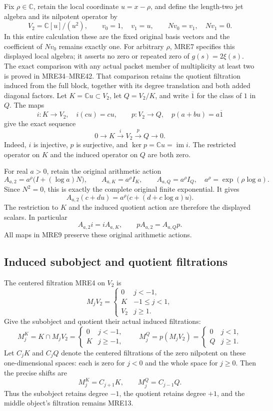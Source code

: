 Fix \(\rho\in\mathbb C\), retain the local coordinate \(u=x-\rho\), and
define the length-two jet algebra and its nilpotent operator by
\[
 V_2=\mathbb C[u]/(u^2),\qquad
 v_0=1,\quad v_1=u,\qquad
 Nv_0=v_1,\quad Nv_1=0.
 \tag{MRE7}
\]
In this entire calculation these are the fixed original basis vectors
and the coefficient of \(Nv_0\) remains exactly one.
For arbitrary \(\rho\), MRE7 specifies this displayed local algebra;
it asserts no zero or repeated zero of \(g(s)=2\xi(s)\).
The exact comparison with any actual packet member of multiplicity
at least two is proved in MRE34--MRE42. That comparison retains the
quotient filtration induced from the full block, together with its
degree translation and both added diagonal factors.
Let \(K=\mathbb C u\subset V_2\), let \(Q=V_2/K\), and write
\(\overline{1}\) for the class of \(1\) in \(Q\). The maps
\[
 i:K\longrightarrow V_2,\quad i(cu)=cu,
 \qquad
 p:V_2\longrightarrow Q,\quad p(a+bu)=a\overline{1}
 \tag{MRE8}
\]
give the exact sequence
\[
 0\longrightarrow K\xrightarrow{i}V_2\xrightarrow{p}Q
   \longrightarrow0.
 \tag{MRE9}
\]
Indeed, \(i\) is injective, \(p\) is surjective, and
\(\ker p=\mathbb C u=\operatorname{im}i\). The restricted operator on
\(K\) and the induced operator on \(Q\) are both zero.

For real \(a>0\), retain the original arithmetic action
\[
 A_{a,2}=a^\rho\bigl(I+(\log a)N\bigr),\qquad
 A_{a,K}=a^\rho I_K,\qquad A_{a,Q}=a^\rho I_Q,
 \quad a^\rho=\exp(\rho\log a).
 \tag{MRE10}
\]
Since \(N^2=0\), this is exactly the complete original finite exponential.
It gives
\[
 A_{a,2}(c+du)=a^\rho\bigl(c+(d+c\log a)u\bigr).
 \tag{MRE11}
\]
The restriction to \(K\) and the induced quotient action are therefore
the displayed scalars. In particular
\[
 A_{a,2}i=iA_{a,K},\qquad pA_{a,2}=A_{a,Q}p.
 \tag{MRE12}
\]
All maps in MRE9 preserve these original arithmetic actions.

\subsection{Induced subobject and quotient filtrations}

The centered filtration MRE4 on \(V_2\) is
\[
 M_jV_2=
 \begin{cases}
 0&j<-1,\\
 K&-1\leq j<1,\\
 V_2&j\geq1.
 \end{cases}
 \tag{MRE13}
\]
Give the subobject and quotient their actual induced filtrations:
\[
 M_j^K=K\cap M_jV_2=
 \begin{cases}0&j<-1,\\K&j\geq-1,\end{cases}
 \qquad
 M_j^Q=p(M_jV_2)=
 \begin{cases}0&j<1,\\Q&j\geq1.\end{cases}
 \tag{MRE14}
\]
Let \(C_jK\) and \(C_jQ\) denote the centered filtrations of the zero
nilpotent on these one-dimensional spaces: each is zero for \(j<0\)
and the whole space for \(j\geq0\). Then the precise shifts are
\[
 M_j^K=C_{j+1}K,\qquad M_j^Q=C_{j-1}Q.
 \tag{MRE15}
\]
Thus the subobject retains degree \(-1\), the quotient retains degree
\(+1\), and the middle object's filtration remains MRE13.

